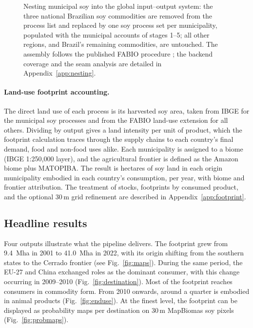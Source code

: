 \documentclass[pdflatex,sn-nature]{sn-jnl}%
\begin{document}
\begin{figure}[htbp]
\caption{Nesting municipal soy into the global input--output system: the
three national Brazilian soy commodities are removed from the process list
and replaced by one soy process set per municipality, populated with the
municipal accounts of stages 1--5; all other regions, and Brazil's
remaining commodities, are untouched. \textcolor{green!50!black}{The
assembly follows the published FABIO procedure
\cite{bruckner2019fabio}; the backend coverage and the seam analysis
are detailed in Appendix~\ref{app:nesting}.}}\label{fig:nesting}
\end{figure}

\paragraph{Land-use footprint accounting.}\label{subsec:footprint}
The direct land use of each process is its harvested soy area, taken from
IBGE for the municipal soy processes and from the FABIO land-use extension
for all others. Dividing by output gives a land intensity per unit of
product, which the footprint calculation traces through the supply chains
to each country's final demand, food and non-food uses alike. Each
municipality is assigned to a biome (IBGE 1:250{,}000 layer), and the
agricultural frontier is defined as the Amazon biome plus MATOPIBA. The
result is hectares of soy land in each origin municipality embodied in
each country's consumption, per year, with biome and frontier attribution.
The treatment of stocks, footprints by consumed product, and the optional
30\,m grid refinement are described in Appendix~\ref{app:footprint}.

\subsection{Headline results}\label{subsec:highlights}
Four outputs illustrate what the pipeline delivers. The footprint grew
from 9.4~Mha in 2001 to 41.0~Mha in 2022, with its origin shifting from
the southern states to the Cerrado frontier (see Fig.~\ref{fig:maps}).
During the same period, the EU-27 and China exchanged roles as the
dominant consumer, with this change occurring in 2009--2010
(Fig.~\ref{fig:destination}). Most of the footprint reaches consumers in
commodity form. From 2010 onwards, around a quarter is embodied in animal
products (Fig.~\ref{fig:enduse}). At the finest level, the footprint can
be displayed as probability maps per destination on 30\,m MapBiomas soy
pixels (Fig.~\ref{fig:probmaps}).
\end{document}
